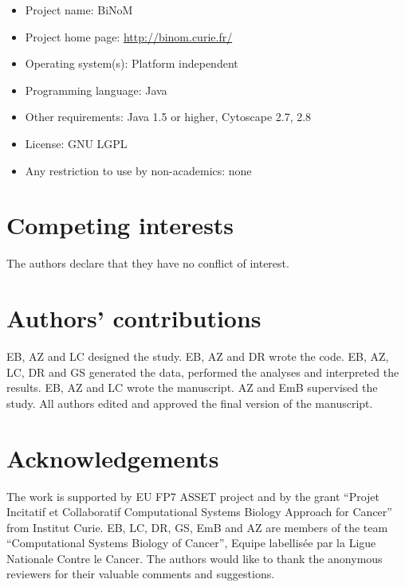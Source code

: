 \documentclass[11pt]{bmc_article_s50}
\newenvironment{bmcformat}{\begin{raggedright}\baselineskip20pt\sloppy\setboolean{publ}{false}}{\end{raggedright}\baselineskip20pt\sloppy}
\begin{document}
\begin{bmcformat}
\begin{itemize}
\item Project name: BiNoM
\item Project home page: \url{http://binom.curie.fr/}
\item Operating system(s): Platform independent
\item Programming language: Java
\item Other requirements: Java 1.5 or higher, Cytoscape 2.7, 2.8
\item License: GNU LGPL
\item Any restriction to use by non-academics: none
\end{itemize}






\section*{Competing interests}
The authors declare that they have no conflict of interest.

\section*{Authors' contributions}
EB, AZ and LC designed the study. EB, AZ and DR wrote the code. EB, AZ, LC, DR
and GS generated the data, performed the analyses and interpreted the results.
EB, AZ and LC wrote the manuscript. AZ and EmB supervised the study. All authors
edited and approved the final version of the manuscript.

\section*{Acknowledgements}
The work is supported by EU FP7 ASSET project and by the grant ``Projet Incitatif et Collaboratif Computational Systems Biology Approach for Cancer'' from Institut Curie.
EB, LC, DR, GS, EmB and AZ are members of the team ``Computational Systems Biology of
Cancer'', Equipe labellisée par la Ligue Nationale Contre le Cancer. The authors would like to thank the anonymous reviewers for their valuable comments and suggestions.



\end{bmcformat}
\end{document}
